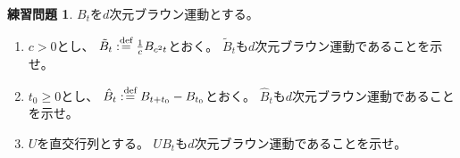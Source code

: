 \documentclass[uplatex]{jsarticle}
\theoremstyle{definition}
\newtheorem{prob}[prob]{練習問題}
\def\dfn{:\overset{\mbox{{\scriptsize def}}}{=}}
\begin{document}
\begin{prob}\label{prob: 3.3}
  \(B_t\)を\(d\)次元ブラウン運動とする。
  \begin{enumerate}
    \item \label{enumi: prob: 3.3-1}
    \(c>0\)とし、
    \(\tilde{B}_t \dfn \frac{1}{c}B_{c^2t}\)とおく。
    \(\tilde{B}_t\)も\(d\)次元ブラウン運動であることを示せ。
    \item \label{enumi: prob: 3.3-2}
    \(t_0 \geq 0\)とし、
    \(\hat{B}_t \dfn B_{t+t_0}-B_{t_0}\)とおく。
    \(\hat{B}_t\)も\(d\)次元ブラウン運動であることを示せ。
    \item \label{enumi: prob: 3.3-3}
    \(U\)を直交行列とする。
    \(UB_t\)も\(d\)次元ブラウン運動であることを示せ。
  \end{enumerate}
\end{prob}
\end{document}
